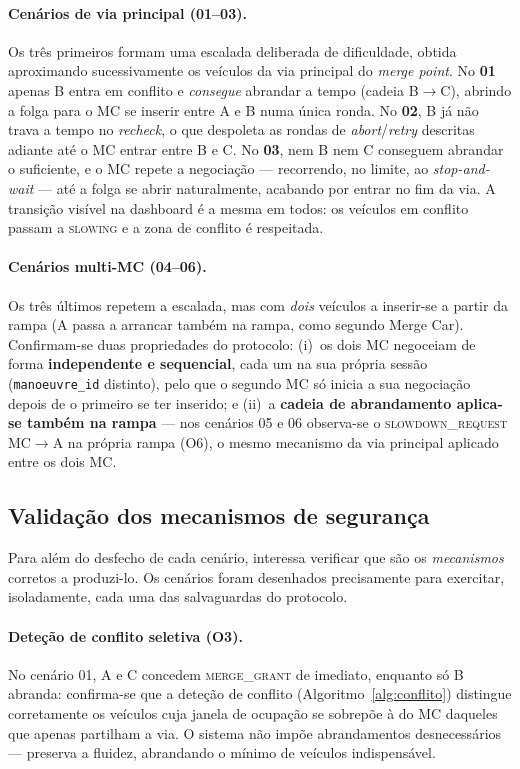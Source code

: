 \documentclass[11pt,a4paper]{article}
\begin{document}
\paragraph{Cenários de via principal (01--03).} Os três primeiros formam uma escalada
deliberada de dificuldade, obtida aproximando sucessivamente os veículos da via
principal do \emph{merge point}. No \textbf{01} apenas B entra em conflito e
\emph{consegue} abrandar a tempo (cadeia B$\rightarrow$C), abrindo a folga para o MC se
inserir entre A e B numa única ronda. No \textbf{02}, B já não trava a tempo no
\emph{recheck}, o que despoleta as rondas de \emph{abort}/\emph{retry} descritas adiante
até o MC entrar entre B e C. No \textbf{03}, nem B nem C conseguem abrandar o suficiente,
e o MC repete a negociação --- recorrendo, no limite, ao \emph{stop-and-wait} --- até a
folga se abrir naturalmente, acabando por entrar no fim da via. A transição visível na
dashboard é a mesma em todos: os veículos em conflito passam a \textsc{slowing} e a zona
de conflito é respeitada.

\paragraph{Cenários multi-MC (04--06).} Os três últimos repetem a escalada, mas com
\emph{dois} veículos a inserir-se a partir da rampa (A passa a arrancar também na rampa,
como segundo Merge Car). Confirmam-se duas propriedades do protocolo: (i)~os dois MC
negoceiam de forma \textbf{independente e sequencial}, cada um na sua própria sessão
(\texttt{manoeuvre\_id} distinto), pelo que o segundo MC só inicia a sua negociação
depois de o primeiro se ter inserido; e (ii)~a \textbf{cadeia de abrandamento aplica-se
também na rampa} --- nos cenários 05 e 06 observa-se o \textsc{slowdown\_request}
MC$\rightarrow$A na própria rampa (O6), o mesmo mecanismo da via principal aplicado entre
os dois MC.

\subsection{Validação dos mecanismos de segurança}
\label{sec:res-seguranca}

Para além do desfecho de cada cenário, interessa verificar que são os
\emph{mecanismos} corretos a produzi-lo. Os cenários foram desenhados precisamente para
exercitar, isoladamente, cada uma das salvaguardas do protocolo.

\paragraph{Deteção de conflito seletiva (O3).} No cenário 01, A e C concedem
\textsc{merge\_grant} de imediato, enquanto só B abranda: confirma-se que a deteção de
conflito (Algoritmo~\ref{alg:conflito}) distingue corretamente os veículos cuja janela de
ocupação se sobrepõe à do MC daqueles que apenas partilham a via. O sistema não impõe
abrandamentos desnecessários --- preserva a fluidez, abrandando o mínimo de veículos
indispensável.
\end{document}
